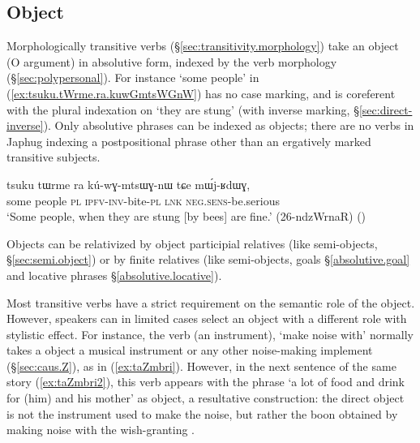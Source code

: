 \subsection{Object} \label{sec:absolutive.P}
Morphologically transitive verbs (§\ref{sec:transitivity.morphology}) take an object (O argument) in absolutive form, indexed by the verb morphology (§\ref{sec:polypersonal}). For instance  `some people' in (\ref{ex:tsuku.tWrme.ra.kuwGmtsWGnW}) has no case marking, and is coreferent with the plural indexation on  `they are stung' (with inverse marking, §\ref{sec:direct-inverse}). Only absolutive phrases can be indexed as objects; there are no verbs in Japhug indexing a postpositional phrase other than an ergatively marked transitive subjects.

\begin{exe}
\ex \label{ex:tsuku.tWrme.ra.kuwGmtsWGnW}
\gll tsuku tɯrme ra kú-wɣ-mtsɯɣ-nɯ tɕe mɯ́j-ʁdɯɣ, \\
some people \textsc{pl} \textsc{ipfv}-\textsc{inv}-bite-\textsc{pl} \textsc{lnk} \textsc{neg}.\textsc{sens}-be.serious \\
\glt `Some people, when they are stung [by bees] are fine.' (26-ndzWrnaR)
()
\end{exe}

Objects can be relativized by object participial relatives (like semi-objects, §\ref{sec:semi.object}) or by finite relatives (like semi-objects, goals §\ref{absolutive.goal}  and locative phrases §\ref{absolutive.locative}).

Most transitive verbs have  a strict requirement on the semantic role of the object. However, speakers can in limited cases select an object with a different role with stylistic effect. For instance, the verb  (an instrument), `make noise with' normally takes a object a musical instrument or any other noise-making implement  (§\ref{sec:caus.Z}), as in (\ref{ex:taZmbri}). However, in the next sentence of the same story (\ref{ex:taZmbri2}), this verb appears with the phrase  `a lot of food and drink for (him) and his mother' as object, a resultative construction: the direct object is not the instrument used to make the noise, but rather the boon obtained by making noise with the wish-granting .

